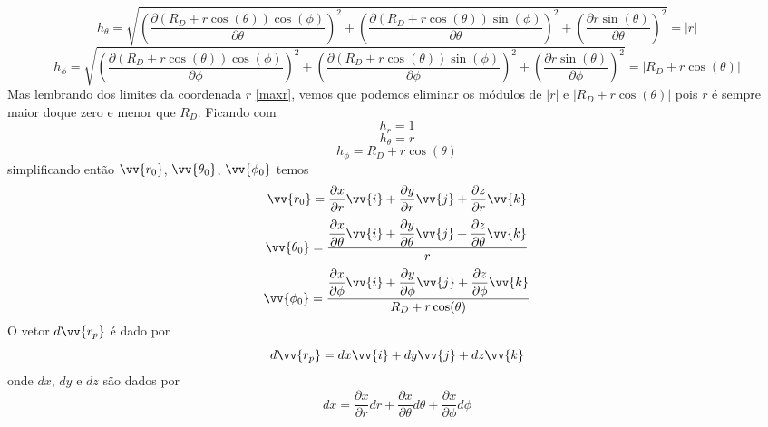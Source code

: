 \documentclass[12pt,oneside,a4paper]{abntex2}
\begin{document}
\begin{equation}
h_\theta = \sqrt{ \left(\dfrac{\partial (R_D+r \cos(\theta)) \cos(\phi)}{\partial \theta} \right)^2 + \left(\dfrac{\partial (R_D+r \cos(\theta)) \sin(\phi)}{\partial \theta}\right)^2 + \left(\dfrac{\partial r \sin(\theta)}{\partial \theta}\right)^2 } =  |r|
\end{equation}
\begin{equation}
h_\phi = \sqrt{ \left(\dfrac{\partial (R_D+r \cos(\theta)) \cos(\phi)}{\partial \phi} \right)^2 + \left(\dfrac{\partial (R_D+r \cos(\theta)) \sin(\phi)}{\partial \phi}\right)^2 + \left(\dfrac{\partial r \sin(\theta)}{\partial \phi}\right)^2 }=|R_D + r \cos(\theta)|
\end{equation}
Mas lembrando dos limites da coordenada $r$ \ref{maxr}, vemos que podemos eliminar os módulos de $|r|$ e $|R_D + r \cos(\theta)|$ pois $r$ é sempre maior doque zero e menor que $R_D$. Ficando com
\begin{equation}
h_r = 1
\end{equation}
\begin{equation}
h_\theta =  r
\end{equation}
\begin{equation}
h_\phi = R_D + r \cos(\theta)
\end{equation}
simplificando então $\vv{r_0}$, $\vv{\theta_0}$, $\vv{\phi_0}$ temos
\begin{equation}
\vv{r_0} = \dfrac{\partial x}{\partial r}\vv{i} + \dfrac{\partial y}{\partial r}\vv{j} + \dfrac{\partial z}{\partial r}\vv{k}
\end{equation}
\begin{equation}
\vv{\theta_0} = \frac{ \dfrac{\partial x}{\partial \theta}\vv{i} + \dfrac{\partial y}{\partial \theta}\vv{j} + \dfrac{\partial z}{\partial \theta}\vv{k} }{r}
\end{equation}
\begin{equation}
\vv{\phi_0} = \frac{\dfrac{\partial x}{\partial \phi}\vv{i} + \dfrac{\partial y}{\partial \phi}\vv{j} + \dfrac{\partial z}{\partial \phi}\vv{k}}{ R_D + r \cos(\theta)}
\end{equation}
O vetor $d\vv{r_p}$ é dado por 
\begin{equation}
d\vv{r_p} = dx\vv{i} + dy\vv{j} + dz\vv{k}
\end{equation}
onde $dx$, $dy$ e $dz$ são dados por
\begin{equation}
dx = \dfrac{\partial x}{\partial r} dr + \dfrac{\partial x}{\partial \theta} d\theta + \dfrac{\partial x}{\partial \phi} d\phi
\end{equation}
\end{document}
